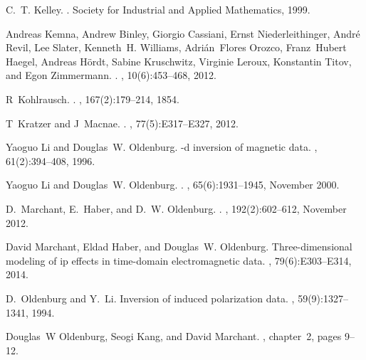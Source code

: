 \documentclass[extra,mreferee]{gji}
\begin{document}
\begin{thebibliography}{}
C.~T. Kelley.
.
\newblock Society for Industrial and Applied Mathematics, 1999.

Andreas Kemna, Andrew Binley, Giorgio Cassiani, Ernst Niederleithinger,
  Andr\'{e} Revil, Lee Slater, Kenneth~H. Williams, Adri\'{a}n~Flores Orozco,
  Franz~Hubert Haegel, Andreas H\"{o}rdt, Sabine Kruschwitz, Virginie Leroux,
  Konstantin Titov, and Egon Zimmermann.
.
, 10(6):453--468, 2012.

R~Kohlrausch.
.
, 167(2):179--214, 1854.

T~Kratzer and J~Macnae.
.
, 77(5):E317--E327, 2012.

Yaoguo Li and Douglas~W. Oldenburg.
-d inversion of magnetic data.
, 61(2):394--408, 1996.

Yaoguo Li and Douglas~W. Oldenburg.
.
, 65(6):1931--1945, November 2000.

D.~Marchant, E.~Haber, and D.~W. Oldenburg.
.
, 192(2):602--612, November
  2012.

David Marchant, Eldad Haber, and Douglas~W. Oldenburg.
\newblock Three-dimensional modeling of ip effects in time-domain
  electromagnetic data.
, 79(6):E303--E314, 2014.

D.~Oldenburg and Y.~Li.
\newblock Inversion of induced polarization data.
, 59(9):1327--1341, 1994.

Douglas~W Oldenburg, Seogi Kang, and David Marchant.
,
  chapter~2, pages 9--12.


\end{thebibliography}
\end{document}
